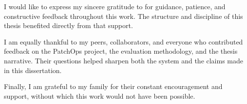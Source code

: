 
I would like to express my sincere gratitude to \textbf{\ThesisSupervisorName} for guidance, patience, and
constructive feedback throughout this work. The structure and discipline of this thesis benefited directly
from that support.

I am equally thankful to my peers, collaborators, and everyone who contributed feedback on the PatchOps
project, the evaluation methodology, and the thesis narrative. Their questions helped sharpen both the system
and the claims made in this dissertation.

Finally, I am grateful to my family for their constant encouragement and support, without which this work would
not have been possible.

\vspace{2cm}
\begin{flushright}
\SignatureBlock[0.34\textwidth]{%
\textbf{\ThesisAuthorName}\\
\ThesisRollNumber\\
\ThesisProgram
}
\end{flushright}

\vfill
\noindent \ThesisApprovalDate\\
\ThesisPlace
\clearpage
